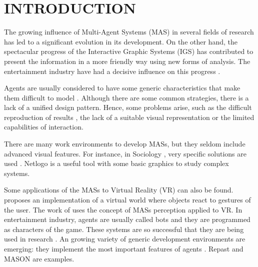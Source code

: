 \documentclass[a4paper,twoside]{article}
\begin{document}
\onecolumn \maketitle \normalsize \vfill



\section{\uppercase{Introduction}
\label{sec:introduction}}

\noindent The growing influence of Multi-Agent Systems (MAS) in several fields of research has led
to a significant evolution in its development. On the other hand, the spectacular progress of the
Interactive Graphic Systems (IGS) has contributed to present the information in a more friendly way
using new forms of analysis. The entertainment industry have had a decisive influence on this
progress \cite{Rhyne2000}.

Agents are usually considered to have some generic characteristics that make them difficult to
model \cite{Gilbert2008}. Although there are some common strategies, there is a lack of a unified
design pattern. Hence, some problems arise, such as the difficult reproduction of results
\cite{Axelrod1997}, the lack of a suitable visual representation or the limited capabilities of
interaction.

There are many work environments to develop MASs, but they seldom include advanced visual features.
For instance, in Sociology \cite{Axelrod1997,Gilbert2008}, very specific solutions are used
\cite{Ulicny2001,Reynolds2000}. Netlogo \cite{Wilensky1999} is a useful tool with some basic
graphics to study complex systems.

Some applications of the MASs to Virtual Reality (VR) can also be found. \cite{Maes1995} proposes
an implementation of a virtual world where objects react to gestures of the user. The work of
\cite{Wachsmuth1995} uses the concept of MASs perception applied to VR. In entertainment industry,
agents are usually called bots \cite{Khoo2002} and they are programmed as characters of the game.
These systems are so successful that they are being used in research \cite{Rhyne2000}. An growing
variety of generic development environments are emerging: they implement the most important
features of agents \cite{Gilbert2008}. Repast \cite{North2005} and MASON \cite{Luke2005} are
examples.
\end{document}
